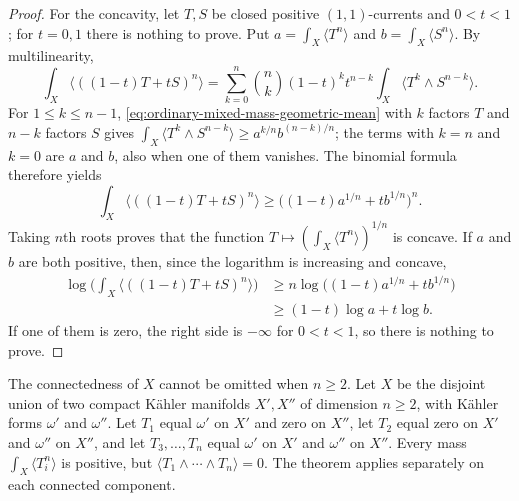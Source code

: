 \begin{proof}
For the concavity, let $T,S$ be closed positive $(1,1)$-currents and $0<t<1$; for $t=0,1$ there is nothing to prove. Put $a=\int_X\langle T^n\rangle$ and $b=\int_X\langle S^n\rangle$. By multilinearity,
\[
 \int_X\langle((1-t)T+tS)^n\rangle=\sum_{k=0}^n\binom nk(1-t)^kt^{n-k}
                           \int_X\langle T^k\wedge S^{n-k}\rangle.
\]
For $1\leq k\leq n-1$, \eqref{eq:ordinary-mixed-mass-geometric-mean} with $k$ factors $T$ and $n-k$ factors $S$ gives $\int_X\langle T^k\wedge S^{n-k}\rangle\geq a^{k/n}b^{(n-k)/n}$; the terms with $k=n$ and $k=0$ are $a$ and $b$, also when one of them vanishes. The binomial formula therefore yields
\[
 \int_X\langle((1-t)T+tS)^n\rangle\geq
              \big((1-t)a^{1/n}+tb^{1/n}\big)^n.
\]
Taking $n$th roots proves that the function $T\mapsto(\int_X\langle T^n\rangle)^{1/n}$ is concave. If $a$ and $b$ are both positive, then, since the logarithm is increasing and concave,
\[
 \begin{aligned}
 \log\Big(\int_X\langle((1-t)T+tS)^n\rangle\Big)
               &\geq n\log\big((1-t)a^{1/n}+tb^{1/n}\big)\\
               &\geq(1-t)\log a+t\log b.
 \end{aligned}
\]
If one of them is zero, the right side is $-\infty$ for $0<t<1$, so there is nothing to prove.
\end{proof}

The connectedness of $X$ cannot be omitted when $n\geq2$. Let $X$ be the disjoint union of two compact K\"ahler manifolds $X',X''$ of dimension $n\geq2$, with K\"ahler forms $\omega'$ and $\omega''$. Let $T_1$ equal $\omega'$ on $X'$ and zero on $X''$, let $T_2$ equal zero on $X'$ and $\omega''$ on $X''$, and let $T_3,\ldots,T_n$ equal $\omega'$ on $X'$ and $\omega''$ on $X''$. Every mass $\int_X\langle T_i^n\rangle$ is positive, but $\langle T_1\wedge\cdots\wedge T_n\rangle=0$. The theorem applies separately on each connected component.
